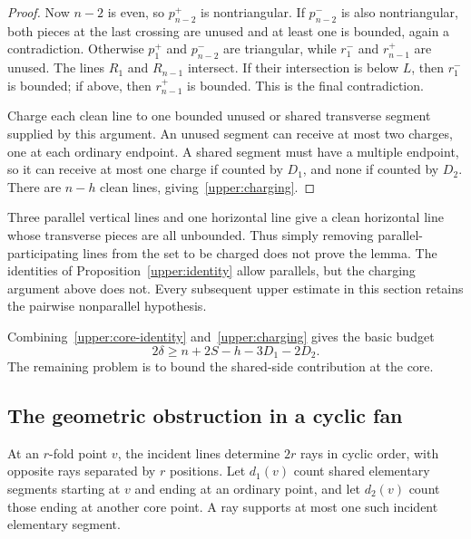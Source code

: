\begin{proof}
Now $n-2$ is even, so $p_{n-2}^+$ is nontriangular. If $p_{n-2}^-$ is also nontriangular, both pieces at the last crossing are unused and at least one is bounded, again a contradiction. Otherwise $p_1^+$ and $p_{n-2}^-$ are triangular, while $r_1^-$ and $r_{n-1}^+$ are unused. The lines $R_1$ and $R_{n-1}$ intersect. If their intersection is below $L$, then $r_1^-$ is bounded; if above, then $r_{n-1}^+$ is bounded. This is the final contradiction.

Charge each clean line to one bounded unused or shared transverse segment supplied by this argument. An unused segment can receive at most two charges, one at each ordinary endpoint. A shared segment must have a multiple endpoint, so it can receive at most one charge if counted by $D_1$, and none if counted by $D_2$. There are $n-h$ clean lines, giving~\eqref{upper:charging}.
\end{proof}

\begin{remark}
Three parallel vertical lines and one horizontal line give a clean horizontal line whose transverse pieces are all unbounded. Thus simply removing parallel-participating lines from the set to be charged does not prove the lemma. The identities of Proposition~\ref{upper:identity} allow parallels, but the charging argument above does not. Every subsequent upper estimate in this section retains the pairwise nonparallel hypothesis.
\end{remark}

Combining~\eqref{upper:core-identity} and~\eqref{upper:charging} gives the basic budget
\begin{equation}
 2\delta\ge n+2S-h-3D_1-2D_2.
 \label{upper:basic-budget}
\end{equation}
The remaining problem is to bound the shared-side contribution at the core.

\subsection{The geometric obstruction in a cyclic fan}

At an $r$-fold point $v$, the incident lines determine $2r$ rays in cyclic order, with opposite rays separated by $r$ positions. Let $d_1(v)$ count shared elementary segments starting at $v$ and ending at an ordinary point, and let $d_2(v)$ count those ending at another core point. A ray supports at most one such incident elementary segment.


